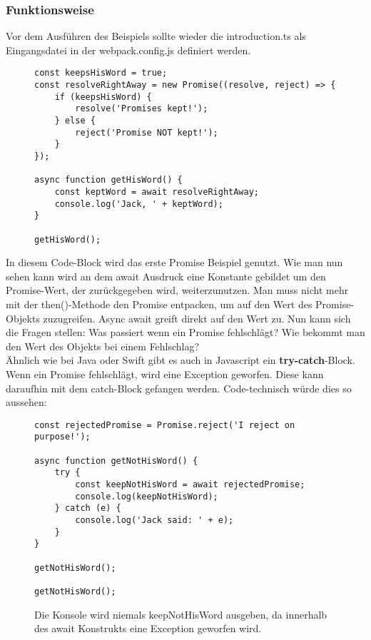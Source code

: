 \subsubsection{Funktionsweise}

\noindent
Vor dem Ausführen des Beispiels sollte wieder die introduction.ts als Eingangsdatei in der webpack.config.js definiert werden.

\begin{figure}[H]
\begin{lstlisting}
const keepsHisWord = true;
const resolveRightAway = new Promise((resolve, reject) => {
    if (keepsHisWord) {
        resolve('Promises kept!');
    } else {
        reject('Promise NOT kept!');
    }
});

async function getHisWord() {
    const keptWord = await resolveRightAway;
    console.log('Jack, ' + keptWord);
}

getHisWord();
\end{lstlisting}
\end{figure}

\noindent
In diesem Code-Block wird das erste Promise Beispiel genutzt. Wie man nun sehen kann wird an dem await Ausdruck eine Konstante gebildet um den Promise-Wert, der zurückgegeben wird, weiterzunutzen. Man muss nicht mehr mit der then()-Methode den Promise entpacken, um auf den Wert des Promise-Objekts zuzugreifen. Async await greift direkt auf den Wert zu. Nun kann sich die Fragen stellen: Was passiert wenn ein Promise fehlschlägt? Wie bekommt man den Wert des Objekts bei einem Fehlschlag? \\

\noindent
Ähnlich wie bei Java oder Swift gibt es auch in Javascript ein \textbf{try-catch}-Block. Wenn ein Promise fehlschlägt, wird eine Exception geworfen.\cite{async-await-heise} Diese kann daraufhin mit dem catch-Block gefangen werden. Code-technisch würde dies so aussehen:

\begin{figure}[H]
\begin{lstlisting}
const rejectedPromise = Promise.reject('I reject on purpose!');

async function getNotHisWord() {
    try {
        const keepNotHisWord = await rejectedPromise;
        console.log(keepNotHisWord);
    } catch (e) {
        console.log('Jack said: ' + e);
    }
}

getNotHisWord();

getNotHisWord();
\end{lstlisting}
\caption{Die Konsole wird niemals keepNotHisWord ausgeben, da innerhalb des await Konstrukts eine Exception geworfen wird.}
\end{figure}

